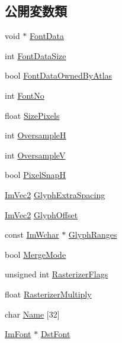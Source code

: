 \subsection*{公開変数類}
\begin{DoxyCompactItemize}
\item 
void $\ast$ \mbox{\hyperlink{struct_im_font_config_a0265861de7ba7b0d953e1c97e7a50cf3}{Font\+Data}}
\item 
int \mbox{\hyperlink{struct_im_font_config_a39df7ad3bb496421ce2cc5d2428345ef}{Font\+Data\+Size}}
\item 
bool \mbox{\hyperlink{struct_im_font_config_a99dfbf61ef79cee89b6f03e17cbe63b4}{Font\+Data\+Owned\+By\+Atlas}}
\item 
int \mbox{\hyperlink{struct_im_font_config_ab37ee3d5cf76000a4000e9296161e527}{Font\+No}}
\item 
float \mbox{\hyperlink{struct_im_font_config_a2eff9cc7a11461414402f08ab910d277}{Size\+Pixels}}
\item 
int \mbox{\hyperlink{struct_im_font_config_ab460df0d8019ffa8d124e8988c710910}{OversampleH}}
\item 
int \mbox{\hyperlink{struct_im_font_config_a8018f84c60bfafb2b4629aeb77a047cb}{OversampleV}}
\item 
bool \mbox{\hyperlink{struct_im_font_config_a635b5fa03934467891fa949a037b5b89}{Pixel\+SnapH}}
\item 
\mbox{\hyperlink{struct_im_vec2}{Im\+Vec2}} \mbox{\hyperlink{struct_im_font_config_a82db103689b1c434ec92875721967c07}{Glyph\+Extra\+Spacing}}
\item 
\mbox{\hyperlink{struct_im_vec2}{Im\+Vec2}} \mbox{\hyperlink{struct_im_font_config_a290a81956fdcb7ad3b5e3152594db121}{Glyph\+Offset}}
\item 
const \mbox{\hyperlink{imgui_8h_af2c7badaf05a0008e15ef76d40875e97}{Im\+Wchar}} $\ast$ \mbox{\hyperlink{struct_im_font_config_aa174ceff80323012cd1b717d864258dd}{Glyph\+Ranges}}
\item 
bool \mbox{\hyperlink{struct_im_font_config_ad5cab281622e5bdec8e2d55cadc5601e}{Merge\+Mode}}
\item 
unsigned int \mbox{\hyperlink{struct_im_font_config_a80d05eea7733731a3e9ac1d9e905e5b3}{Rasterizer\+Flags}}
\item 
float \mbox{\hyperlink{struct_im_font_config_a9365265cc52098a8ecf89ff47f6106f2}{Rasterizer\+Multiply}}
\item 
char \mbox{\hyperlink{struct_im_font_config_abcd5db10139b42fbac90e31512c64f08}{Name}} \mbox{[}32\mbox{]}
\item 
\mbox{\hyperlink{struct_im_font}{Im\+Font}} $\ast$ \mbox{\hyperlink{struct_im_font_config_a561773c311f6cf6de00642c2801e7b92}{Dst\+Font}}
\end{DoxyCompactItemize}


